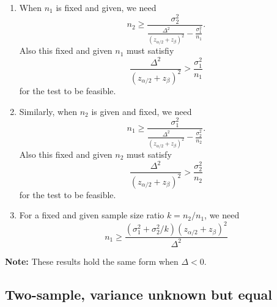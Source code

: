\documentclass[a4paper,12pt]{article}
\begin{document}
\begin{enumerate}
\item When $n_1$ is fixed and given, we need
  \[
    n_2 \geq
    \frac{
      \sigma_2^2
    }{
      \frac{\Delta^2}{
        \left(
          z_{\alpha / 2} + z_{\beta}
        \right)^2
      }
      - \frac{\sigma_1^2}{n_1}
    }
    .
  \]
  Also this fixed and given $n_1$ must satisfiy
  \[
    \frac{\Delta^2}{
      \left(
        z_{\alpha / 2} + z_{\beta}
      \right)^2
    }
    >
    \frac{\sigma_1^2}{n_1}
  \]
  for the test to be feasible.
\item Similarly, when $n_2$ is given and fixed, we need
  \[
    n_1 \geq
    \frac{\sigma_1^2}{
      \frac{\Delta^2}{
        \left(
          z_{\alpha / 2} + z_{\beta}
        \right)^2
      }
      - \frac{\sigma_2^2}{n_2}
    }
    .
  \]
  Also this fixed and given $n_2$ must satisfy
  \[
        \frac{\Delta^2}{
      \left(
        z_{\alpha / 2} + z_{\beta}
      \right)^2
    }
    >
    \frac{\sigma_2^2}{n_2}
  \]
  for the test to be feasible.
\item For a fixed and given sample size ratio $k = n_2 / n_1$, we need
  \[
    n_1 \geq
    \frac{
      \left(\sigma_1^2 + \sigma_2^2 / k\right)
      \left(
        z_{\alpha / 2} + z_{\beta}
      \right)^2
    }{
      \Delta^2
    }
  \]
\end{enumerate}
\textbf{Note: } These results hold the same form when $\Delta < 0$.

\subsection{Two-sample, variance unknown but equal}
\label{sec:two-sample-variance-1}
\end{document}
